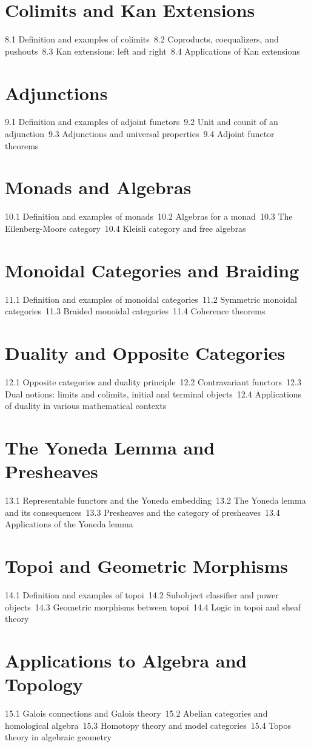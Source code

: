 \section{Colimits and Kan Extensions}
8.1 Definition and examples of colimits\
8.2 Coproducts, coequalizers, and pushouts\
8.3 Kan extensions: left and right\
8.4 Applications of Kan extensions\
\section{Adjunctions}
9.1 Definition and examples of adjoint functors\
9.2 Unit and counit of an adjunction\
9.3 Adjunctions and universal properties\
9.4 Adjoint functor theorems\
\section{Monads and Algebras}
10.1 Definition and examples of monads\
10.2 Algebras for a monad\
10.3 The Eilenberg-Moore category\
10.4 Kleisli category and free algebras\
\section{Monoidal Categories and Braiding}
11.1 Definition and examples of monoidal categories\
11.2 Symmetric monoidal categories\
11.3 Braided monoidal categories\
11.4 Coherence theorems\
\section{Duality and Opposite Categories}
12.1 Opposite categories and duality principle\
12.2 Contravariant functors\
12.3 Dual notions: limits and colimits, initial and terminal objects\
12.4 Applications of duality in various mathematical contexts\
\section{The Yoneda Lemma and Presheaves}
13.1 Representable functors and the Yoneda embedding\
13.2 The Yoneda lemma and its consequences\
13.3 Presheaves and the category of presheaves\
13.4 Applications of the Yoneda lemma\
\section{Topoi and Geometric Morphisms}
14.1 Definition and examples of topoi\
14.2 Subobject classifier and power objects\
14.3 Geometric morphisms between topoi\
14.4 Logic in topoi and sheaf theory\
\section{Applications to Algebra and Topology}
15.1 Galois connections and Galois theory\
15.2 Abelian categories and homological algebra\
15.3 Homotopy theory and model categories\
15.4 Topos theory in algebraic geometry\

